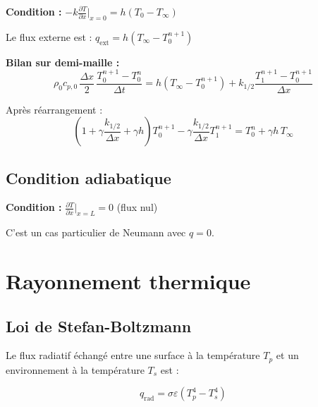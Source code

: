 \documentclass[11pt,a4paper]{article}
\begin{document}
\begin{tcolorbox}[colback=gray!5,colframe=gray!50!black]
\textbf{Condition :} $-k \frac{\partial T}{\partial x}\Big|_{x=0} = h(T_0 - T_\infty)$

Le flux externe est : $q_{\text{ext}} = h(T_\infty - T_0^{n+1})$

\textbf{Bilan sur demi-maille :}
\begin{equation}
\rho_0 c_{p,0} \, \frac{\Delta x}{2} \, \frac{T_0^{n+1} - T_0^n}{\Delta t} = h(T_\infty - T_0^{n+1}) + k_{1/2} \frac{T_1^{n+1} - T_0^{n+1}}{\Delta x}
\end{equation}

Après réarrangement :
\begin{equation}
\left(1 + \gamma \frac{k_{1/2}}{\Delta x} + \gamma h\right) T_0^{n+1} - \gamma \frac{k_{1/2}}{\Delta x} T_1^{n+1} = T_0^n + \gamma h \, T_\infty
\end{equation}
\end{tcolorbox}

\subsection{Condition adiabatique}

\begin{tcolorbox}[colback=gray!5,colframe=gray!50!black]
\textbf{Condition :} $\frac{\partial T}{\partial x}\Big|_{x=L} = 0$ (flux nul)

C'est un cas particulier de Neumann avec $q = 0$.
\end{tcolorbox}

\section{Rayonnement thermique}

\subsection{Loi de Stefan-Boltzmann}

Le flux radiatif échangé entre une surface à la température $T_p$ et un environnement à la température $T_s$ est :

\begin{tcolorbox}[colback=blue!5,colframe=bleu,title=\textbf{Loi de Stefan-Boltzmann}]
\begin{equation}
q_{\text{rad}} = \sigma \varepsilon (T_p^4 - T_s^4)
\label{eq:stefan}
\end{equation}
\end{tcolorbox}
\end{document}
